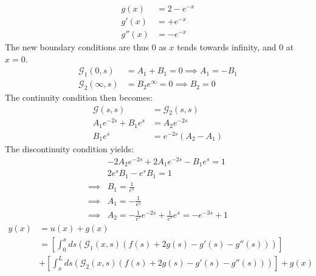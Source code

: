 \documentclass{article}
\newcommand{\G}{\mathcal{G}}
\begin{document}
\begin{align*}
    g(x) &= 2 - e^{-x}\\
    g'(x) &= +e^{-x}\\
    g''(x) &= - e^{-x}
\end{align*}The new boundary conditions are thus $0$ as $x$ tends towards infinity, and $0$ at $x = 0$.
\begin{align*}
    \G_1(0,s) &= A_1 + B_1 = 0 \implies A_1 = - B_1\\
    \G_2(\infty, s) &= B_2e^{\infty} = 0\implies B_2 = 0
\end{align*}The continuity condition then becomes:
\begin{align*}
    \G(s,s) &= \G_2(s,s)\\
    A_1e^{-2s} + B_1 e^{s} &= A_2e^{-2s}\\
    B_1e^{s} &= e^{-2s}(A_2 - A_1)
\end{align*}The discontinuity condition yields:
\begin{align*}
    &-2A_2e^{-2s} +2A_1e^{-2s} - B_1e^{s} = 1\\
    &2e^{s}B_1 - e^{s}B_1 = 1\\
    \implies&B_1 = \frac{1}{e^{s}}\\
    \implies&A_1 = -\frac{1}{e^{s}}\\
    \implies&A_2 = -\frac{1}{e^{s}}e^{-2s} + \frac{1}{e^s} e^{s} = -e^{-3s} + 1
\end{align*}
\begin{align*}
    y(x) &= u(x) + g(x)\\
    &= \left[\int_0^x ds\left(\G_1(x,s)(f(s) +2g(s) - g'(s) -g''(s))\right)\right] \\
    &+ \left[\int_x^L ds\left(\G_2(x,s)(f(s) +2g(s) - g'(s) -g''(s))\right)\right] +g(x)
\end{align*}
\end{document}
